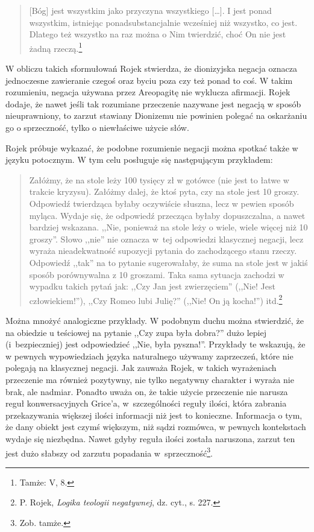 \begin{quote}
    [Bóg] jest wszystkim jako przyczyna wszystkiego […]. I jest ponad
wszystkim, istniejąc ponadsubstancjalnie wcześniej niż wszystko, co
jest. Dlatego też wszystko na raz można o Nim twierdzić, choć On nie
jest żadną rzeczą.\footnote{Tamże: V, 8. }
\end{quote}





W obliczu takich sformułowań Rojek stwierdza, że dionizyjska negacja
oznacza jednoczesne zawieranie czegoś oraz byciu poza czy też ponad to
coś. W takim rozumieniu, negacja używana przez Areopagitę nie wyklucza
afirmacji. Rojek dodaje, że nawet jeśli tak rozumiane przeczenie nazywane jest negacją w sposób nieuprawniony,
to zarzut stawiany Dionizemu nie powinien
polegać na oskarżaniu go o sprzeczność, tylko o niewłaściwe użycie
słów.

Rojek próbuje wykazać, że podobne rozumienie negacji można spotkać także
w języku potocznym. W tym celu posługuje się następującym przykładem:

\begin{quote}
    Załóżmy, że na stole leży 100 tysięcy zł w gotówce (nie jest to łatwe w
trakcie kryzysu). Załóżmy dalej, że ktoś pyta, czy na stole jest 10
groszy. Odpowiedź twierdząca byłaby oczywiście słuszna, lecz w pewien
sposób myląca. Wydaje się, że odpowiedź przecząca byłaby dopuszczalna,
a nawet bardziej wskazana. ,,Nie, ponieważ na stole leży o wiele, wiele
więcej niż 10 groszy''. Słowo ,,nie'' nie oznacza w~tej odpowiedzi
klasycznej negacji, lecz wyraża nieadekwatność supozycji pytania do
zachodzącego stanu rzeczy. Odpowiedź ,,tak'' na to pytanie sugerowałaby,
że suma na stole jest w jakiś sposób porównywalna z 10 groszami. Taka
sama sytuacja zachodzi w wypadku takich pytań jak: ,,Czy Jan jest
zwierzęciem'' (,,Nie! Jest człowiekiem!''), ,,Czy Romeo lubi Julię?'' (,,Nie!
On ją kocha!'') itd.\footnote{P. Rojek, \textit{Logika teologii negatywnej}, dz. cyt., s. 227. }
\end{quote}






Można mnożyć analogiczne przykłady. W podobnym duchu można stwierdzić,
że na obiedzie u teściowej na pytanie ,,Czy zupa była dobra?'' dużo
lepiej (i~bezpieczniej) jest odpowiedzieć ,,Nie, była pyszna!''.
Przykłady te wskazują, że w pewnych wypowiedziach  języka naturalnego
używamy zaprzeczeń, które nie polegają na klasycznej negacji. Jak
zauważa Rojek, w takich wyrażeniach przeczenie ma również pozytywny, nie tylko negatywny
charakter i wyraża nie brak, ale nadmiar. Ponadto uważa on, że takie
użycie przeczenie nie narusza reguł konwersacyjnych Grice'a, w~szczególności reguły ilości, która zabrania przekazywania większej
ilości informacji niż jest to konieczne. Informacja o tym, że dany
obiekt jest czymś większym, niż sądzi rozmówca, w pewnych kontekstach
wydaje się niezbędna. Nawet gdyby reguła ilości została naruszona,
zarzut ten jest dużo słabszy od zarzutu popadania w~sprzeczność\footnote{Zob. tamże.}.


